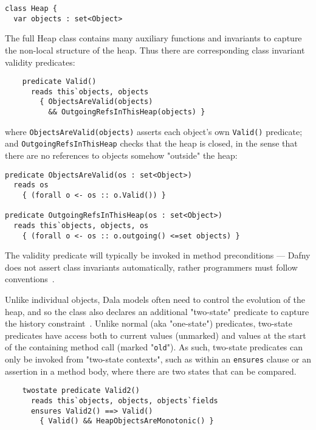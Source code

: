 \begin{lstlisting}
class Heap {
  var objects : set<Object>
\end{lstlisting}

 \noindent The full Heap class contains many auxiliary functions and invariants to capture the non-local structure of the heap. Thus there are corresponding class invariant validity predicates:

\begin{lstlisting}
    predicate Valid() 
      reads this`objects, objects
        { ObjectsAreValid(objects)
          && OutgoingRefsInThisHeap(objects) }
\end{lstlisting}

\noindent where \lstinline+ObjectsAreValid(objects)+  asserts each object's own \lstinline+Valid()+ predicate; and \lstinline+OutgoingRefsInThisHeap+ checks that the heap is closed, in the sense that there are no references to objects somehow "outside" the heap:

\begin{lstlisting}
predicate ObjectsAreValid(os : set<Object>) 
  reads os
    { (forall o <- os :: o.Valid()) }
        
predicate OutgoingRefsInThisHeap(os : set<Object>) 
  reads this`objects, objects, os
    { (forall o <- os :: o.outgoing() <=set objects) }
\end{lstlisting}

\noindent The validity predicate will typically be invoked in method preconditions --- Dafny does not assert class invariants automatically, rather programmers must follow conventions~\cite{Parkinson07}.

Unlike individual objects, Dala models often need to control the evolution of the heap, and so the class also declares an additional "two-state" predicate to capture the history constraint~\cite{Leavens-etal07}. Unlike normal (aka "one-state") predicates, two-state predicates have access both to current values (unmarked) and values at the start of the containing method call (marked "\lstinline+old+"). As such, two-state predicates can only be invoked from "two-state contexts", such as within an \lstinline+ensures+ clause or an assertion in a method body, 
where there are two states that can be compared.


\begin{lstlisting}
    twostate predicate Valid2()
      reads this`objects, objects, objects`fields
      ensures Valid2() ==> Valid()
        { Valid() && HeapObjectsAreMonotonic() }
\end{lstlisting}










